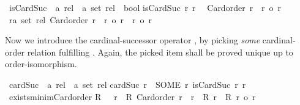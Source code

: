 \begin{isabellebody}
\isamarkupfalse%
\ isCardSuc\ {\isacharcolon}{\kern0pt}{\isacharcolon}{\kern0pt}\ {\isachardoublequoteopen}{\isacharprime}{\kern0pt}a\ rel\ {\isasymRightarrow}\ {\isacharprime}{\kern0pt}a\ set\ rel\ {\isasymRightarrow}\ bool{\isachardoublequoteclose}\isanewline
{}\isanewline
{\isachardoublequoteopen}isCardSuc\ r\ r{\isacharprime}{\kern0pt}\ {\isasymequiv}\isanewline
\ Card{\isacharunderscore}{\kern0pt}order\ r{\isacharprime}{\kern0pt}\ {\isasymand}\ r\ {\isacharless}{\kern0pt}o\ r{\isacharprime}{\kern0pt}\ {\isasymand}\isanewline
\ {\isacharparenleft}{\kern0pt}{\isasymforall}{\isacharparenleft}{\kern0pt}r{\isacharprime}{\kern0pt}{\isacharprime}{\kern0pt}{\isacharcolon}{\kern0pt}{\isacharcolon}{\kern0pt}{\isacharprime}{\kern0pt}a\ set\ rel{\isacharparenright}{\kern0pt}{\isachardot}{\kern0pt}\ Card{\isacharunderscore}{\kern0pt}order\ r{\isacharprime}{\kern0pt}{\isacharprime}{\kern0pt}\ {\isasymand}\ r\ {\isacharless}{\kern0pt}o\ r{\isacharprime}{\kern0pt}{\isacharprime}{\kern0pt}\ {\isasymlongrightarrow}\ r{\isacharprime}{\kern0pt}\ {\isasymle}o\ r{\isacharprime}{\kern0pt}{\isacharprime}{\kern0pt}{\isacharparenright}{\kern0pt}{\isachardoublequoteclose}%
\begin{isamarkuptext}%
Now we introduce the cardinal-successor operator ,
by picking {\em some} cardinal-order relation fulfilling .
Again, the picked item shall be proved unique up to order-isomorphism.%
\end{isamarkuptext}\isamarkuptrue%
\isamarkupfalse%
\ cardSuc\ {\isacharcolon}{\kern0pt}{\isacharcolon}{\kern0pt}\ {\isachardoublequoteopen}{\isacharprime}{\kern0pt}a\ rel\ {\isasymRightarrow}\ {\isacharprime}{\kern0pt}a\ set\ rel{\isachardoublequoteclose}\isanewline
{}\isanewline
{\isachardoublequoteopen}cardSuc\ r\ {\isasymequiv}\ SOME\ r{\isacharprime}{\kern0pt}{\isachardot}{\kern0pt}\ isCardSuc\ r\ r{\isacharprime}{\kern0pt}{\isachardoublequoteclose}\isanewline
\isanewline
{}\isamarkupfalse%
\ exists{\isacharunderscore}{\kern0pt}minim{\isacharunderscore}{\kern0pt}Card{\isacharunderscore}{\kern0pt}order{\isacharcolon}{\kern0pt}\isanewline
{\isachardoublequoteopen}{\isasymlbrakk}R\ {\isasymnoteq}\ {\isacharbraceleft}{\kern0pt}{\isacharbraceright}{\kern0pt}{\isacharsemicolon}{\kern0pt}\ {\isasymforall}r\ {\isasymin}\ R{\isachardot}{\kern0pt}\ Card{\isacharunderscore}{\kern0pt}order\ r{\isasymrbrakk}\ {\isasymLongrightarrow}\ {\isasymexists}r\ {\isasymin}\ R{\isachardot}{\kern0pt}\ {\isasymforall}r{\isacharprime}{\kern0pt}\ {\isasymin}\ R{\isachardot}{\kern0pt}\ r\ {\isasymle}o\ r{\isacharprime}{\kern0pt}{\isachardoublequoteclose}\isanewline

\end{isabellebody}
